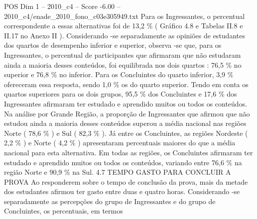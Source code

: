 \begin{textsample}{POS Dim 1 – 2010\_c4 – Score -6.00 – 2010\_c4/enade\_2010\_fono\_c03e305949.txt}
Para os Ingressantes, o percentual correspondente a essas alternativas foi de 13,2 \% ( Gráfico 4.8 e Tabelas II.8 e II.17 no Anexo II ).
Considerando -se separadamente as opiniões de estudantes dos quartos de desempenho inferior e superior, observa -se que, para os Ingressantes, o percentual de participantes que afirmaram que não estudaram ainda a maioria desses conteúdos, foi equilibrada nos dois quartos : 76,5 \% no superior e 76,8 \% no inferior.
Para os Concluintes do quarto inferior, 3,9 \% ofereceram essa resposta, sendo 1,0 \% os do quarto superior.
Tendo em conta os quartos superiores para os dois grupos, 95,5 \% dos Concluintes e 17,6 \% dos Ingressantes afirmaram ter estudado e aprendido muitos ou todos os conteúdos.
Na análise por Grande Região, a proporção de Ingressantes que afirmou que não estudou ainda a maioria desses conteúdos superou a média nacional nas regiões Norte ( 78,6 \% ) e Sul ( 82,3 \% ).
Já entre os Concluintes, as regiões Nordeste ( 2,2 \% ) e Norte ( 4,2 \% ) apresentaram percentuais maiores do que a média nacional para esta alternativa.
Em todas as regiões, os Concluintes afirmaram ter estudado e aprendido muitos ou todos os conteúdos, variando entre 76,6 \% na região Norte e 90,9 \% na Sul. 4.7 TEMPO GASTO PARA CONCLUIR A PROVA Ao responderem sobre o tempo de conclusão da prova, mais da metade dos estudantes afirmou ter gasto entre duas e quatro horas.
Considerando -se separadamente as percepções do grupo de Ingressantes e do grupo de Concluintes, os percentuais, em termos

\end{textsample}

